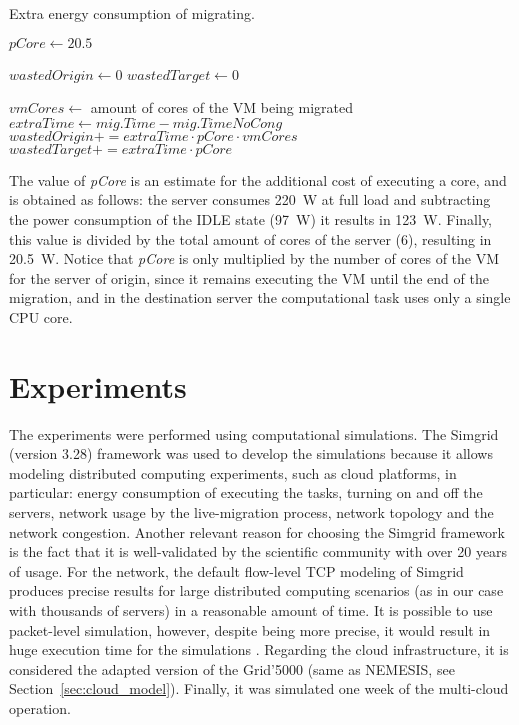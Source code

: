 \begin{algorithm}
\begin{algorithmic}
\caption{Extra energy consumption of migrating.}\label{alg:wasted_energy}

\State $pCore \gets 20.5$

\State $wastedOrigin \gets 0$
\State $wastedTarget \gets 0$

    \State $vmCores \gets$ amount of cores of the VM being migrated
    \State $extraTime \gets mig.Time - mig.TimeNoCong$
        \State $wastedOrigin += extraTime \cdot pCore \cdot vmCores$ 
        \State $wastedTarget += extraTime \cdot pCore$ 
    \EndIf
\EndFor
\end{algorithmic}
\end{algorithm}

The value of \textit{pCore} is an estimate for the additional cost of executing a core, and is obtained as follows: the server consumes \SI{220}{\watt} at full load and subtracting the power consumption of the IDLE state (\SI{97}{\watt}) it results in \SI{123}{\watt}. Finally, this value is divided by the total amount of cores of the server (6), resulting in \SI{20.5}{\watt}. Notice that \textit{pCore} is only multiplied by the number of cores of the VM for the server of origin, since it remains executing the VM until the end of the migration, and in the destination server the computational task uses only a single CPU core.


\section{Experiments}
\label{sec:simulations_smargreens}

The experiments were performed using computational simulations. The Simgrid \cite{CASANOVA20142899} (version 3.28) framework was used to develop the simulations because it allows modeling distributed computing experiments, such as cloud platforms, in particular: energy consumption of executing the tasks, turning on and off the servers, network usage by the live-migration process, network topology and the network congestion. Another relevant reason for choosing the Simgrid framework is the fact that it is well-validated by the scientific community with over 20 years of usage. For the network, the default flow-level TCP modeling of Simgrid produces precise results for large distributed computing scenarios (as in our case with thousands of servers) in a reasonable amount of time. It is possible to use packet-level simulation, however, despite being more precise, it would result in huge execution time for the simulations \cite{velho2013simgridparameters}. Regarding the cloud infrastructure, it is considered the adapted version of the Grid'5000 (same as NEMESIS, see Section~\ref{sec:cloud_model}). Finally, it was simulated one week of the multi-cloud operation.

